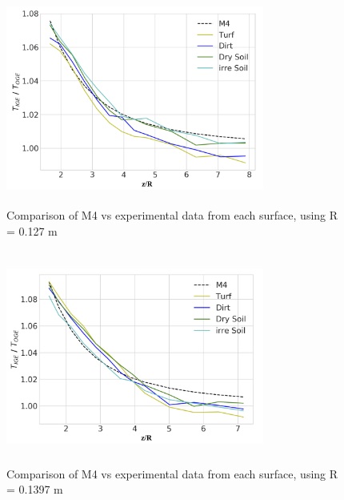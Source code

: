 \documentclass[twocolumn,10pt]{asme2ej}
\begin{document}
\begin{figure}[t]
  \begin{center}
  \setlength{\unitlength}{0.012500in}%
  \includegraphics[width=8.5cm, height=7cm]{Images/r2_surface_comp.png}
  \caption{Comparison of M4 vs experimental data from each surface, using R = 0.127 m}
  \end{center}
  \label{r2_sx_c_plot}
\end{figure}

\begin{figure}[t]
  \begin{center}
  \setlength{\unitlength}{0.012500in}%
  \includegraphics[width=8.5cm, height=7cm]{Images/r3_surface_comp.png}
  \caption{Comparison of M4 vs experimental data from each surface, using R = 0.1397 m}
  \end{center}
  \label{r3_sx_c_plot}
\end{figure}
\end{document}

